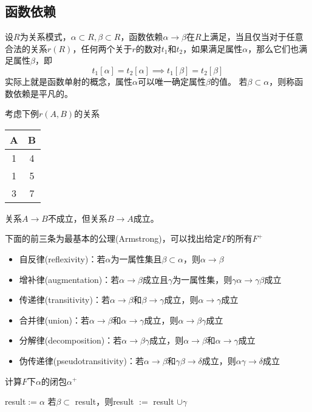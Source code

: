 \subsection{函数依赖}
\begin{definition}
设$R$为关系模式，$\alpha\subset R,\beta\subset R$，函数依赖$\alpha\to\beta$在$R$上满足，当且仅当对于任意合法的关系$r(R)$，任何两个关于$r$的数对$t_1$和$t_2$，如果满足属性$\alpha$，那么它们也满足属性$\beta$，即
\[t_1[\alpha]=t_2[\alpha]\implies t_1[\beta]=t_2[\beta]\]
实际上就是函数单射的概念，属性$\alpha$可以唯一确定属性$\beta$的值。
若$\beta\subset\alpha$，则称函数依赖是平凡的。
\end{definition}
考虑下例$r(A,B)$的关系
\begin{center}
\begin{tabular}{|c|c|}\hline
A & B\\\hline
1 & 4\\\hline
1 & 5\\\hline
3 & 7\\\hline
\end{tabular}
\end{center}
关系$A\to B$不成立，但关系$B\to A$成立。

\begin{theorem}[逻辑蕴含公理]
下面的前三条为最基本的公理(Armstrong)，可以找出给定$F$的所有$F^+$
\begin{itemize}
	\item 自反律(reflexivity)：若$\alpha$为一属性集且$\beta\subset\alpha$，则$\alpha\to\beta$
	\item 增补律(augmentation)：若$\alpha\to\beta$成立且$\gamma$为一属性集，则$\gamma\alpha\to\gamma\beta$成立
	\item 传递律(transitivity)：若$\alpha\to\beta$和$\beta\to\gamma$成立，则$\alpha\to\gamma$成立
	\item 合并律(union)：若$\alpha\to\beta$和$\alpha\to\gamma$成立，则$\alpha\to\beta\gamma$成立
	\item 分解律(decomposition)：若$\alpha\to\beta\gamma$成立，则$\alpha\to\beta$和$\alpha\to\gamma$成立
	\item 伪传递律(pseudotransitivity)：若$\alpha\to\beta$和$\gamma\beta\to\delta$成立，则$\alpha\gamma\to\delta$成立
\end{itemize}
\end{theorem}

\begin{algorithm}
\caption*{计算$F$下$\alpha$的闭包$\alpha^+$}
\begin{algorithmic}[1]
\State result$:=\alpha$
\Repeat
{}
\State 若$\beta\subset$ result，则result $:=$ result $\cup\gamma$
\EndFor
{}
\end{algorithmic}
\end{algorithm}


